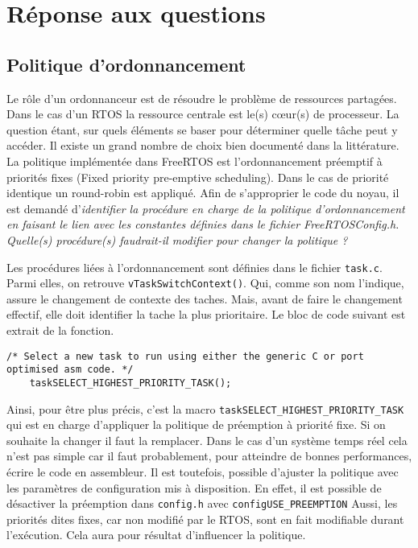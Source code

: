 \section{Réponse aux questions}

\subsection{Politique d'ordonnancement}
Le rôle d'un ordonnanceur est de résoudre le problème de ressources partagées.
Dans le cas d'un RTOS la ressource centrale est le(s) cœur(s) de processeur.
La question étant, sur quels éléments se baser pour déterminer quelle tâche peut y accéder.
Il existe un grand nombre de choix bien documenté dans la littérature.
La politique implémentée dans FreeRTOS est l'ordonnancement préemptif à priorités fixes (Fixed priority pre-emptive scheduling).
Dans le cas de priorité identique un round-robin est appliqué.
Afin de s'approprier le code du noyau, il est demandé d'\textit{identifier la procédure en charge de la politique d’ordonnancement en faisant le lien avec les constantes définies dans le fichier FreeRTOSConfig.h.
Quelle(s) procédure(s) faudrait-il modifier pour changer la politique ?}
\gap

Les procédures liées à l'ordonnancement sont définies dans le fichier \texttt{task.c}.
Parmi elles, on retrouve \texttt{vTaskSwitchContext()}.
Qui, comme son nom l'indique, assure le changement de contexte des taches.
Mais, avant de faire le changement effectif, elle doit identifier la tache la plus prioritaire.
Le bloc de code suivant est extrait de la fonction.
\begin{lstlisting}[style=CStyle]
    /* Select a new task to run using either the generic C or port optimised asm code. */
    taskSELECT_HIGHEST_PRIORITY_TASK();
\end{lstlisting}
Ainsi, pour être plus précis, c'est la macro \texttt{taskSELECT\_HIGHEST\_PRIORITY\_TASK} qui est en charge d'appliquer la politique de préemption à priorité fixe.
Si on souhaite la changer il faut la remplacer.
Dans le cas d'un système temps réel cela n'est pas simple car il faut probablement, pour atteindre de bonnes performances, écrire le code en assembleur.
Il est toutefois, possible d'ajuster la politique avec les paramètres de configuration mis à disposition.
En effet, il est possible de désactiver la préemption dans \texttt{config.h} avec \texttt{configUSE\_PREEMPTION}
Aussi, les priorités dites fixes, car non modifié par le RTOS, sont en fait modifiable durant l'exécution.
Cela aura pour résultat d'influencer la politique.

